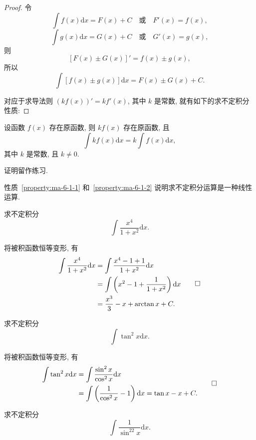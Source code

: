 \begin{proof}
令
\[
  \int f(x)\mathrm dx=F(x)+C
  \quad\text{或}\quad
  F'(x)=f(x),
\]
\[
  \int g(x)\mathrm dx=G(x)+C
  \quad\text{或}\quad
  G'(x)=g(x),
\]
则
\[
  [F(x)\pm G(x)]'=f(x)\pm g(x),
\]
所以
\[
  \int[f(x)\pm g(x)]\mathrm dx=F(x)\pm G(x)+C.
\]

对应于求导法则 $(kf(x))'=kf'(x)$, 其中 $k$ 是常数, 就有如下的求不定积分性质:
\end{proof}


\begin{property}\label{property:ma-6-1-2}
设函数 $f(x)$ 存在原函数, 则 $kf(x)$ 存在原函数, 且
\[
  \int kf(x)\mathrm dx=k\int f(x)\mathrm dx,
\]
其中 $k$ 是常数, 且 $k\ne0$.
\end{property}


证明留作练习.

性质~\ref{property:ma-6-1-1} 和~\ref{property:ma-6-1-2} 说明求不定积分运算是一种线性运算.

\begin{example}\label{example:ma-6-1-1}
求不定积分
\[
  \int\frac{x^4}{1+x^2}\mathrm dx.
\]
\end{example}


\begin{solve}
将被积函数恒等变形, 有
\[
\begin{aligned}
  \int\frac{x^4}{1+x^2}\mathrm dx
  &=
  \int\frac{x^4-1+1}{1+x^2}\mathrm dx\\
  &=
  \int\left(x^2-1+\frac1{1+x^2}\right)\mathrm dx\\
  &=
  \frac{x^3}{3}-x+\arctan x+C.
\end{aligned}
\qedhere
\]
\end{solve}


\begin{example}\label{example:ma-6-1-2}
求不定积分
\[
  \int\tan^2x\mathrm dx.
\]
\end{example}


\begin{solve}
将被积函数恒等变形, 有
\[
\begin{aligned}
  \int\tan^2x\mathrm dx
  &=
  \int\frac{\sin^2x}{\cos^2x}\mathrm dx\\
  &=
  \int\left(\frac1{\cos^2x}-1\right)\mathrm dx
  =
  \tan x-x+C.
\end{aligned}
\qedhere
\]
\end{solve}


\begin{example}\label{example:ma-6-1-3}
求不定积分
\[
  \int\frac1{\sin^22x}\mathrm dx.
\]
\end{example}


